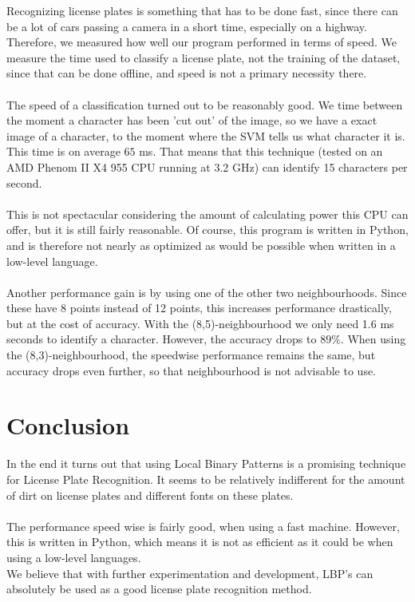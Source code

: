 \documentclass[a4paper]{article}
\begin{document}
Recognizing license plates is something that has to be done fast, since there
can be a lot of cars passing a camera in a short time, especially on a highway.
Therefore, we measured how well our program performed in terms of speed. We
measure the time used to classify a license plate, not the training of the
dataset, since that can be done offline, and speed is not a primary necessity
there.\\
\\
The speed of a classification turned out to be reasonably good. We time between
the moment a character has been 'cut out' of the image, so we have a exact
image of a character, to the moment where the SVM tells us what character it
is. This time is on average $65$ ms. That means that this
technique (tested on an AMD Phenom II X4 955 CPU running at 3.2 GHz)
can identify 15 characters per second.\\
\\
This is not spectacular considering the amount of calculating power this CPU
can offer, but it is still fairly reasonable. Of course, this program is
written in Python, and is therefore not nearly as optimized as would be
possible when written in a low-level language.\\
\\
Another performance gain is by using one of the other two neighbourhoods.
Since these have 8 points instead of 12 points, this increases performance
drastically, but at the cost of accuracy. With the (8,5)-neighbourhood
we only need 1.6 ms seconds to identify a character. However, the accuracy
drops to $89\%$. When using the (8,3)-neighbourhood, the speedwise performance
remains the same, but accuracy drops even further, so that neighbourhood
is not advisable to use.

\section{Conclusion}

In the end it turns out that using Local Binary Patterns is a promising
technique for License Plate Recognition. It seems to be relatively indifferent
for the amount of dirt on license plates and different fonts on these plates.\\
\\
The performance speed wise is fairly good, when using a fast machine. However,
this is written in Python, which means it is not as efficient as it could be
when using a low-level languages.
\\
We believe that with further experimentation and development, LBP's can
absolutely be used as a good license plate recognition method.
\end{document}
